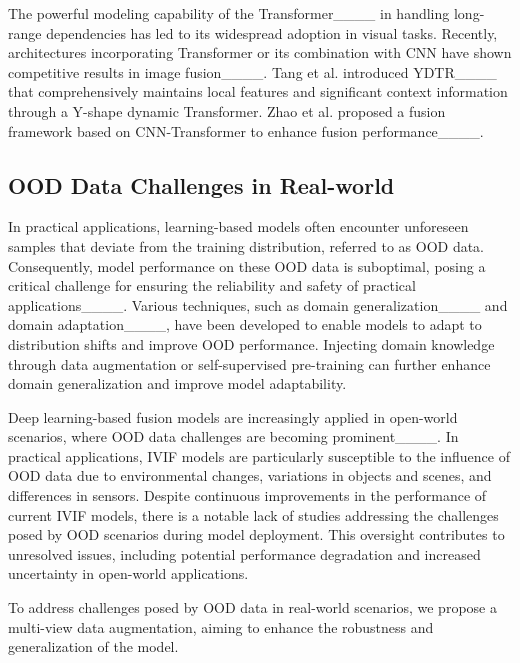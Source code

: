 The powerful modeling capability of the Transformer____ in handling long-range dependencies has led to its widespread adoption in visual tasks. Recently, architectures incorporating Transformer or its combination with CNN have shown competitive results in image fusion____.
Tang et al. introduced YDTR____ that comprehensively maintains local features and significant context information through a Y-shape dynamic Transformer.
Zhao et al. proposed a fusion framework based on CNN-Transformer to enhance fusion performance____.

\subsection{OOD Data Challenges in Real-world}
In practical applications, learning-based models often encounter unforeseen samples that deviate from the training distribution, referred to as OOD data. Consequently, model performance on these OOD data is suboptimal, posing a critical challenge for ensuring the reliability and safety of practical applications____. Various techniques, such as domain generalization____ and domain adaptation____, have been developed to enable models to adapt to distribution shifts and improve OOD performance. Injecting domain knowledge through data augmentation or self-supervised pre-training can further enhance domain generalization and improve model adaptability. 

Deep learning-based fusion models are increasingly applied in open-world scenarios, where OOD data challenges are becoming prominent____. In practical applications, IVIF models are particularly susceptible to the influence of OOD data due to environmental changes, variations in objects and scenes, and differences in sensors. Despite continuous improvements in the performance of current IVIF models, there is a notable lack of studies addressing the challenges posed by OOD scenarios during model deployment. This oversight contributes to unresolved issues, including potential performance degradation and increased uncertainty in open-world applications.

To address challenges posed by OOD data in real-world scenarios, we propose a multi-view data augmentation, aiming to enhance the robustness and generalization of the model.